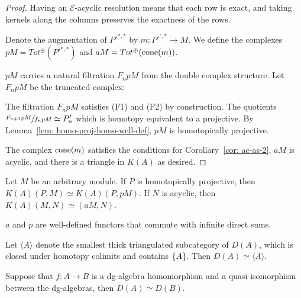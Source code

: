 \documentclass[../thesis.tex]{subfiles}
\begin{document}
\begin{proof}
                Having an $\mathcal{E}$-acyclic resolution means that each row is exact, and taking kernels along the columns preserves the exactness of the rows.
                
                Denote the augmentation of $P'^{*,*}$ by $m : P'^{',*} \rightarrow M$. We define the complexes $pM = Tot^\oplus(P'^{*,*})$ and $aM = Tot^\oplus(\tt{cone}(m))$.
                
                $pM$ carries a natural filtration $F_npM$ from the double complex structure. Let $F_npM$ be the truncated complex:
                \begin{center}
                \end{center}
                
                The filtration $F_npM$ satisfies (F1) and (F2) by construction. The quotients $\sfrac{F_{n+1}pM}{f_npM} \simeq P'_n$ which is homotopy equivalent to a projective. By Lemma~\ref{lem: homo-proj-homo-well-def}, $pM$ is homotopically projective.
                
                The complex $\tt{cone}(m)$ satisfies the conditions for Corollary~\ref{cor: ac-as-2}, $aM$ is acyclic, and there is a triangle in $K(A)$ as desired.
            \end{proof}

            \begin{corollary}
                Let $M$ be an arbitrary module. If $P$ is homotopically projective, then $K(A)(P,M) \simeq K(A)(P, pM)$. If $N$ is acyclic, then $K(A)(M, N) \simeq (aM, N)$.

                $a$ and $p$ are well-defined functors that commute with infinite direct sums. 
            \end{corollary}

            \begin{corollary}
                Let $\langle A \rangle$ denote the smallest thick triangulated subcategory of $D(A)$, which is closed under homotopy colimits and contains $\startset{A}$. Then $D(A) \simeq \langle A \rangle$.
            \end{corollary}

            \begin{corollary}\label{cor: ring-qiso-is-eq}
                Suppose that $f: A \rightarrow B$ is a dg-algebra homomorphism and a quasi-isomorphism between the dg-algebras, then $D(A) \simeq D(B)$.
            \end{corollary}
\end{document}
